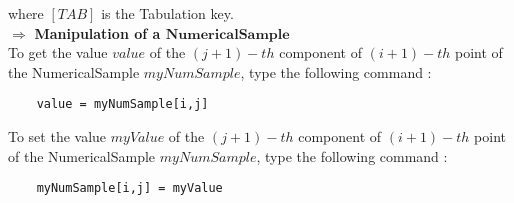 where $[TAB]$ is the Tabulation key.\\


$\boldsymbol{\Longrightarrow}$ {\bf Manipulation of a $\boldsymbol{NumericalSample}$}\\

To get the value $value$ of the  $(j+1)-th$ component of $(i+1)-th$ point of the NumericalSample $myNumSample$, type the following command : 

\begin{center}
  \begin{lstlisting}
    value = myNumSample[i,j]
  \end{lstlisting}
\end{center}

To set the value $myValue$ of the  $(j+1)-th$ component of $(i+1)-th$ point of the NumericalSample $myNumSample$, type the following command : 

\begin{center}
  \begin{lstlisting}
    myNumSample[i,j] = myValue
  \end{lstlisting}
\end{center}